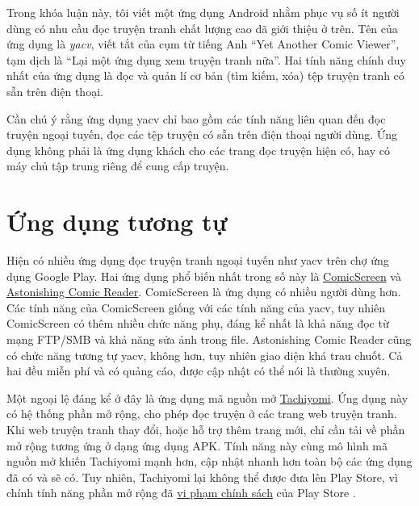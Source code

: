 \documentclass[../../thesis]{subfiles}
\begin{document}
Trong khóa luận này, tôi viết một ứng dụng Android nhằm phục vụ số ít người dùng
có nhu cầu đọc truyện tranh chất lượng cao đã giới thiệu ở trên. Tên của ứng
dụng là \emph{yacv}, viết tắt của cụm từ tiếng Anh ``Yet Another Comic Viewer'',
tạm dịch là ``Lại một ứng dụng xem truyện tranh nữa''. Hai tính năng chính duy
nhất của ứng dụng là đọc và quản lí cơ bản (tìm kiếm, xóa) tệp truyện tranh có
sẵn trên điện thoại.

Cần chú ý rằng ứng dụng yacv chỉ bao gồm các tính năng liên quan đến đọc truyện
ngoại tuyến, đọc các tệp truyện có sẵn trên điện thoại người dùng. Ứng dụng
không phải là ứng dụng khách cho các trang đọc truyện hiện có, hay có máy chủ
tập trung riêng để cung cấp truyện.



\section{Ứng dụng tương tự}\label{sec:similar-apps}


\newcommand{\ComicScreen}{https://play.google.com/store/apps/details?id=com.viewer.comicscreen\&hl=en\&gl=US}
\newcommand{\AstonishComic}{https://play.google.com/store/apps/details?id=com.aerilys.acr.android\&hl=en\&gl=US}
\newcommand{\Tachiyomi}{https://github.com/tachiyomiorg/tachiyomi}
\newcommand{\TachiyomiIssue}{https://github.com/tachiyomiorg/tachiyomi/issues/1745}
\newcommand{\KuroReader}{https://play.google.com/store/apps/details?id=br.com.kurotoshiro.leitor_manga\&hl=en\&gl=US}


Hiện có nhiều ứng dụng đọc truyện tranh ngoại tuyến như yacv trên chợ ứng dụng
Google Play. Hai ứng dụng phổ biến nhất trong số này là
\href{\ComicScreen}{ComicScreen} và \href{\AstonishComic}{Astonishing Comic
Reader}. ComicScreen là ứng dụng có nhiều người dùng hơn. Các tính năng của
ComicScreen giống với các tính năng của yacv, tuy nhiên ComicScreen có thêm
nhiều chức năng phụ, đáng kể nhất là khả năng đọc từ mạng FTP/SMB và khả năng
sửa ảnh trong file. Astonishing Comic Reader cũng có chức năng tương tự yacv,
không hơn, tuy nhiên giao diện khá trau chuốt. Cả hai đều miễn phí và có quảng
cáo, được cập nhật có thể nói là thường xuyên.

Một ngoại lệ đáng kể ở đây là ứng dụng mã nguồn mở \href{\Tachiyomi}{Tachiyomi}.
Ứng dụng này có hệ thống phần mở rộng, cho phép đọc truyện ở các trang web
truyện tranh. Khi web truyện tranh thay đổi, hoặc hỗ trợ thêm trang mới, chỉ cần
tải về phần mở rộng tương ứng ở dạng ứng dụng APK. Tính năng này cùng mô hình mã
nguồn mở khiến Tachiyomi mạnh hơn, cập nhật nhanh hơn toàn bộ các ứng dụng đã có
và sẽ có. Tuy nhiên, Tachiyomi lại không thể được đưa lên Play Store, vì chính
tính năng phần mở rộng đã \href{\TachiyomiIssue}{vi phạm chính sách} của Play
Store \cite{GH_TACHI}.
\end{document}
